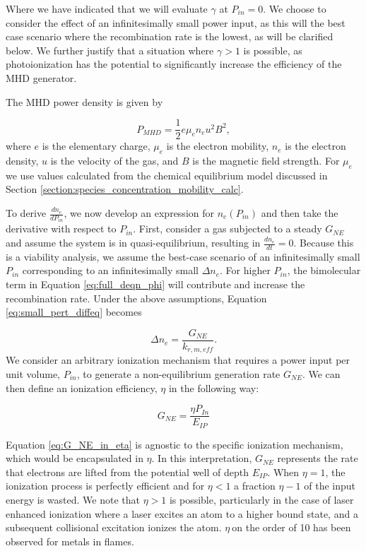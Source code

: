 Where we have indicated that we will evaluate $\gamma$ at $P_{in} = 0$. We choose to consider the effect of an infinitesimally small power input, as this will the best case scenario where the recombination rate is the lowest, as will be clarified below. We further justify that a situation where $\gamma > 1$ is possible, as photoionization has the potential to significantly increase the efficiency of the MHD generator. %

The MHD power density is given by

\begin{equation}
  \label{eq:mhd_power}
P_{MHD} = \frac{1}{2} e \mu_e n_e u^2 B^2,
\end{equation}
where $e$ is the elementary charge, $\mu_e$ is the electron mobility, $n_e$ is the electron density, $u$ is the velocity of the gas, and $B$ is the magnetic field strength. For $\mu_e$ we use values calculated from the chemical equilibrium model discussed in Section \ref{section:species_concentration_mobility_calc}.

To derive $\frac{dn_{e}}{dP_{in}}$, we now develop an expression for $n_e(P_{in})$ and then take the derivative with respect to $P_{in}$. First, consider a gas subjected to a steady $G_{NE}$ and assume the system is in quasi-equilibrium, resulting in $\frac{dn_{e}}{dt} = 0$. Because this is a viability analysis, we assume the best-case scenario of an infinitesimally small $P_{in}$ corresponding to an infinitesimally small $\Delta n_{e}$. For higher $P_{in}$, the bimolecular term in Equation \ref{eq:full_deqn_phi} will contribute and increase the recombination rate. Under the above assumptions, Equation \ref{eq:small_pert_diffeq} becomes

\begin{equation}
\Delta n_{e} = \frac{G_{NE}}{k_{r, m, eff}}.
\end{equation}
We consider an arbitrary ionization mechanism that requires a power input per unit volume, \(P_{in}\), to generate a non-equilibrium generation rate \(G_{NE}\). We can then define an ionization efficiency, \(\eta\) in the following way: %

\begin{equation}
{G}_{NE} = \frac{\eta P_{In}}{E_{IP}}
\label{eq:G_NE_in_eta}
\end{equation}

Equation \ref{eq:G_NE_in_eta} is agnostic to the specific ionization mechanism, which would be encapsulated in \(\eta\). In this interpretation, \(G_{NE}\) represents the rate that electrons are lifted from the potential well of depth \(E_{IP}\). When \(\eta = 1\), the ionization process is perfectly efficient and for \(\eta < 1\) a fraction \(\eta - 1\) of the input energy is wasted. We note that \(\eta > 1\) is possible, particularly in the case of laser enhanced ionization where a laser excites an atom to a higher bound state, and a subsequent collisional excitation ionizes the atom. \(\eta\ \)on the order of 10 has been observed for metals in flames.\cite{turkOpticalDetectionLaserInduced1986}

